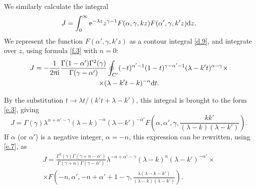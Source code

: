 We similarly calculate the integral
\begin{equation}\label{f.9}
J=\int_{0}^{\infty}\mathrm{e}^{-\lambda z}z^{\gamma-1}F(\alpha,\gamma,kz)F(\alpha',\gamma,k'z)\mathrm{d} z.
\end{equation}
We represent the function $ F (\alpha', \gamma, k'z) $ as a contour integral \eqref{d.9}, and integrate over $ z $, using formula \eqref{f.3} with $ n = 0 $:
\begin{multline*}
J=-\frac{1}{2\uppi\mathrm{i}}\frac{\Gamma(1-\alpha')\Gamma^2(\gamma)}{\Gamma(\gamma-\alpha')}\oint_{C'}(-t)^{\alpha'-1}(1-t)^{\gamma-\alpha'-1}(\lambda-k't)^{\alpha-\gamma}\times\\
\times(\lambda-k't-k)^{-\alpha}\mathrm{d} t.
\end{multline*}



By the substitution $ t \to \lambda t/(k't + \lambda - k') $, this integral is brought to the form \eqref{e.3}, giving
\begin{equation}\label{f.10}
J=\Gamma(\gamma)\lambda^{\alpha+\alpha'-\gamma}(\lambda-k)^{-\alpha}(\lambda-k')^{-\alpha'}F\left(\alpha,\alpha',\gamma,\frac{kk'}{(\lambda-k)(\lambda-k')} \right).
\end{equation}
If $\alpha$ (or $ \alpha' $) is a negative integer, $ \alpha = -n $, this expression can be rewritten, using \eqref{e.7}, as
\begin{multline}\label{f.11}
J=\frac{\Gamma^2(\gamma)\Gamma(\gamma+n-\alpha')}{\Gamma(\gamma+n)\Gamma(\gamma-\alpha')}\lambda^{-n+\alpha'-\gamma}(\lambda-k)^n(\lambda-k')^{-\alpha'}\times\\
\times F(-n,\alpha',-n+\alpha'+1-\gamma,\frac{\lambda(\lambda-k-k')}{(\lambda-k)(\lambda-k')}).
\end{multline}



